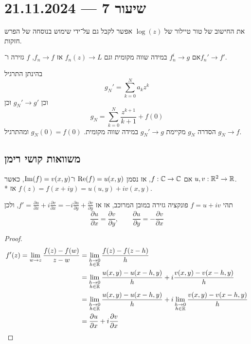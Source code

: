 \section{שיעור 7 --- 21.11.2024}
\begin{remark}
	את החישוב של טור טיילור של $\log(z)$ אפשר לקבל גם על־ידי שימוש בנוסחה של הפרש חזקות.
\end{remark}
\begin{exercise}
	אם $f_n^i \to g$ במידה שווה מקומית וגם $f_n(z) \to L$ אז $f_n \to f$, $f$ גזירה ו־$f_n' \to f'$.
\end{exercise}
בהינתן התרגיל
\[
	g_N' = \sum_{k = 0}^{N} a_k z^k
\]
וכן $g_N' \to g'$ וכן
\[
	g_N = \sum_{k = 0}^{N} \frac{z^{k + 1}}{k + 1} + f(0)
\]
הסדרה $g_N$ מקיימת $g_N' \to g$ במידה שווה מקומית. $g_N(0) = f(0)$ ומהתרגיל $g_N \to f$.

\subsection{משוואות קושי רימן}
\begin{notation}
	אם $f : \mathbb{C} \to \mathbb{C}$, אז נסמן $\operatorname{Re}(f) = u(x, y)$ ו־$\operatorname{Im}(f) = v(x, y)$, כאשר $u, v : \mathbb{R}^2 \to \mathbb{R}$. \\*
	אז $f(z) = f(x + iy) = u(u, y) + i v(x, y)$.
\end{notation}
\begin{proposition}
	תהי $f = u + i v$ פונקציה גזירה במובן המרוכב, אז
	אז $f' = \frac{\partial u}{\partial x} + i \frac{\partial v}{\partial x} = -i \frac{\partial u}{\partial y} + \frac{\partial v}{\partial y}$, ולכן
	\[
		\frac{\partial u}{\partial x} = \frac{\partial v}{\partial y},
		\qquad
		\frac{\partial u}{\partial y} = - \frac{\partial v}{\partial x}
	\]
\end{proposition}
\begin{proof}
	\begin{align*}
		f'(z) = \lim_{w \to z} \frac{f(z) - f(w)}{z - w}
		& = \lim_{\substack{h \to 0 \\ h \in \mathbb{R}}} \frac{f(z) - f(z - h)}{h} \\
		& = \lim_{\substack{h \to 0 \\ h \in \mathbb{R}}} \frac{u(x, y) - u(x - h, y)}{h} + i \frac{v(x, y) - v(x - h, y)}{h} \\
		& = \lim_{\substack{h \to 0 \\ h \in \mathbb{R}}} \frac{u(x, y) - u(x - h, y)}{h} + i \lim_{\substack{h \to 0 \\ h \in \mathbb{R}}} \frac{v(x, y) - v(x - h, y)}{h} \\
		& = \frac{\partial u}{\partial x} + i \frac{\partial v}{\partial x}
	\end{align*}
\end{proof}
